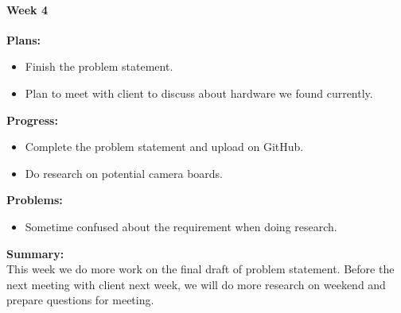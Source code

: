 \paragraph{Week 4}
\begin{adjustwidth}{2.5em}{0pt}
    \vspace{-0.5cm}\textbf{Plans:}
    \vspace{-0.5cm}
    \begin{itemize}
        \item Finish the problem statement.
        \item Plan to meet with client to discuss about hardware we found currently.
    \end{itemize} 
    \vspace{-0.3cm}\textbf{Progress:}
    \vspace{-0.5cm}
    \begin{itemize}
        \item Complete the problem statement and upload on GitHub.
        \item Do research on potential camera boards.
    \end{itemize} 
    \vspace{-0.3cm}\textbf{Problems:}
    \vspace{-0.5cm}
    \begin{itemize}
        \item Sometime confused about the requirement when doing research.
    \end{itemize}  
    \vspace{-0.3cm}\noindent\textbf{Summary:}\\
    \noindent This week we do more work on the final draft of problem statement. Before the next meeting 
    with client next week, we will do more research on weekend and prepare questions for meeting. \\
\end{adjustwidth} 

